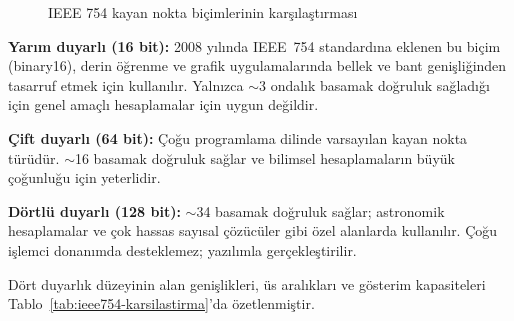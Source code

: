 \begin{figure}[H]
\caption{IEEE 754 kayan nokta biçimlerinin karşılaştırması}
\label{fig:ieee754-tum}
\end{figure}

\textbf{Yarım duyarlı (16 bit):} 2008 yılında IEEE~754 standardına eklenen bu biçim (binary16), derin öğrenme ve grafik uygulamalarında bellek ve bant genişliğinden tasarruf etmek için kullanılır. Yalnızca $\sim$3 ondalık basamak doğruluk sağladığı için genel amaçlı hesaplamalar için uygun değildir.

\textbf{Çift duyarlı (64 bit):} Çoğu programlama dilinde varsayılan kayan nokta türüdür. $\sim$16 basamak doğruluk sağlar ve bilimsel hesaplamaların büyük çoğunluğu için yeterlidir.

\textbf{Dörtlü duyarlı (128 bit):} $\sim$34 basamak doğruluk sağlar; astronomik hesaplamalar ve çok hassas sayısal çözücüler gibi özel alanlarda kullanılır. Çoğu işlemci donanımda desteklemez; yazılımla gerçekleştirilir.

Dört duyarlık düzeyinin alan genişlikleri, üs aralıkları ve gösterim kapasiteleri Tablo~\ref{tab:ieee754-karsilastirma}'da özetlenmiştir.

